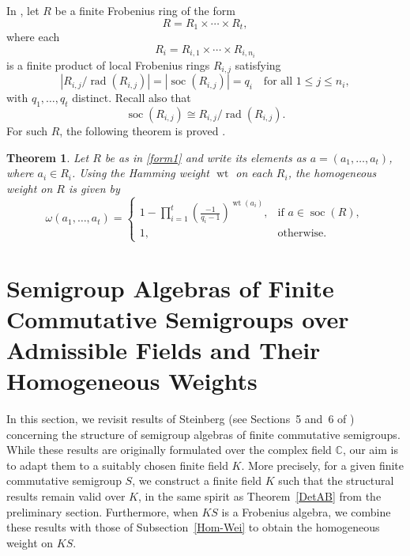 \documentclass[11pt,reqno]{amsart}
\theoremstyle{plain}
\newtheorem{thm}{Theorem}[section]
\theoremstyle{remark}
\theoremstyle{definition}
\newcommand{\soc}{\mathop{\mathrm{soc}}\nolimits}
\newcommand{\rad}{\mathop{\mathrm{rad}}\nolimits}
\begin{document}
In \cite{Gluesing-Luerssen2016}, let $R$ be a finite Frobenius ring of the form
\begin{equation}\label{form1}
R = R_1 \times \cdots \times R_t,
\end{equation}
where each
\[
R_i = R_{i,1} \times \cdots \times R_{i,n_i}
\]
is a finite product of local Frobenius rings $R_{i,j}$ satisfying
\[
|R_{i,j}/\rad(R_{i,j})| = |\soc(R_{i,j})| = q_i
\quad \text{for all } 1\leq j \leq n_i,
\]
with $q_1,\dots,q_t$ distinct.
Recall also that
\[
\soc(R_{i,j}) \cong R_{i,j}/\rad(R_{i,j}).
\]
For such $R$, the following theorem is proved  \cite[Theorem 3.9]{Gluesing-Luerssen2016}. 

\begin{thm}\label{WeightDirectFrobeniusLocalDif}
Let $R$ be as in \eqref{form1} and write its elements as
$a = (a_1,\dots,a_t)$, where $a_i \in R_i$. Using the Hamming weight
$\operatorname{wt}$ on each $R_i$, the homogeneous weight
on $R$ is given by
\[
\omega(a_1,\dots,a_t)
=
\begin{cases}
\displaystyle
1 - \prod_{i=1}^t \left(\frac{-1}{q_i - 1}\right)^{\operatorname{wt}(a_i)}, 
& \text{if } a \in \soc(R), \\[1.2ex]
1, & \text{otherwise}.
\end{cases}
\]
\end{thm}


\section{Semigroup Algebras of Finite Commutative Semigroups over Admissible Fields and Their Homogeneous Weights}\label{SemAlgebraComSem}

In this section, we revisit results of Steinberg (see Sections~5 and~6 of \cite{Ste-Fac-det}) concerning the structure of semigroup algebras of finite commutative semigroups. While these results are originally formulated over the complex field $\mathbb{C}$, our aim is to adapt them to a suitably chosen finite field $K$.
More precisely, for a given finite commutative semigroup $S$, we construct a finite field $K$ such that the structural results remain valid over $K$, in the same spirit as Theorem~\ref{DetAB} from the preliminary section.
Furthermore, when $KS$ is a Frobenius algebra, we combine these results with those of Subsection~\ref{Hom-Wei} to obtain the homogeneous weight on $KS$.
\end{document}

